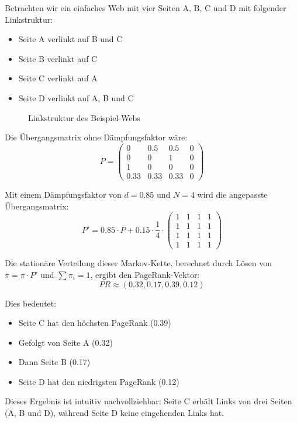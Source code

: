 \begin{myexample}
Betrachten wir ein einfaches Web mit vier Seiten A, B, C und D mit folgender Linkstruktur:
\begin{itemize}
    \item Seite A verlinkt auf B und C
    \item Seite B verlinkt auf C
    \item Seite C verlinkt auf A
    \item Seite D verlinkt auf A, B und C
\end{itemize}

\begin{figure}[H]
    \centering
    \caption{Linkstruktur des Beispiel-Webs}
    \label{fig:pagerank-example}
\end{figure}

Die Übergangsmatrix ohne Dämpfungsfaktor wäre:
\[
    P = \begin{pmatrix}
        0    & 0.5  & 0.5  & 0 \\
        0    & 0    & 1    & 0 \\
        1    & 0    & 0    & 0 \\
        0.33 & 0.33 & 0.33 & 0
    \end{pmatrix}
\]

Mit einem Dämpfungsfaktor von $d = 0.85$ und $N = 4$ wird die angepasste Übergangsmatrix:
\[
    P' = 0.85 \cdot P + 0.15 \cdot \frac{1}{4} \cdot \begin{pmatrix}
        1 & 1 & 1 & 1 \\
        1 & 1 & 1 & 1 \\
        1 & 1 & 1 & 1 \\
        1 & 1 & 1 & 1
    \end{pmatrix}
\]

Die stationäre Verteilung dieser Markov-Kette, berechnet durch Lösen von $\pi = \pi \cdot P'$ und $\sum \pi_i = 1$, ergibt den PageRank-Vektor:
\[
    PR \approx (0.32, 0.17, 0.39, 0.12)
\]

Dies bedeutet:
\begin{itemize}
    \item Seite C hat den höchsten PageRank (0.39)
    \item Gefolgt von Seite A (0.32)
    \item Dann Seite B (0.17)
    \item Seite D hat den niedrigsten PageRank (0.12)
\end{itemize}

Dieses Ergebnis ist intuitiv nachvollziehbar: Seite C erhält Links von drei Seiten (A, B und D), während Seite D keine eingehenden Links hat.
\end{myexample}


